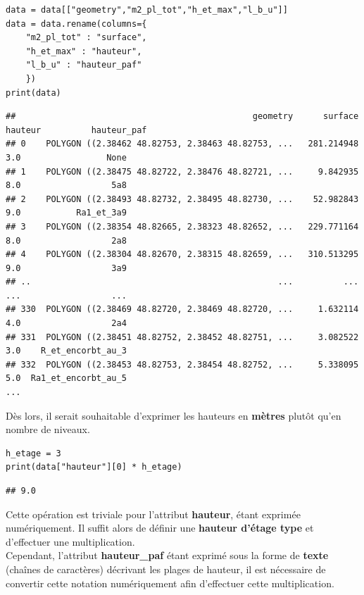 \documentclass[
  11pt,
  french,
]{article}
\begin{document}
\begin{tcolorbox}[title= Apurement et renommage du jeu de données ,colback=boitecode]
\begin{lstlisting}[style=code]
data = data[["geometry","m2_pl_tot","h_et_max","l_b_u"]]
data = data.rename(columns={
    "m2_pl_tot" : "surface",
    "h_et_max" : "hauteur",
    "l_b_u" : "hauteur_paf"
    })
print(data)\end{lstlisting}
\begin{lstlisting}[style=out]
##                                               geometry      surface  hauteur          hauteur_paf
## 0    POLYGON ((2.38462 48.82753, 2.38463 48.82753, ...   281.214948      3.0                 None
## 1    POLYGON ((2.38475 48.82722, 2.38476 48.82721, ...     9.842935      8.0                  5a8
## 2    POLYGON ((2.38493 48.82732, 2.38495 48.82730, ...    52.982843      9.0           Ra1_et_3a9
## 3    POLYGON ((2.38354 48.82665, 2.38323 48.82652, ...   229.771164      8.0                  2a8
## 4    POLYGON ((2.38304 48.82670, 2.38315 48.82659, ...   310.513295      9.0                  3a9
## ..                                                 ...          ...      ...                  ...
## 330  POLYGON ((2.38469 48.82720, 2.38469 48.82720, ...     1.632114      4.0                  2a4
## 331  POLYGON ((2.38451 48.82752, 2.38452 48.82751, ...     3.082522      3.0    R_et_encorbt_au_3
## 332  POLYGON ((2.38453 48.82753, 2.38454 48.82752, ...     5.338095      5.0  Ra1_et_encorbt_au_5
...
\end{lstlisting}
\end{tcolorbox}

Dès lors, il serait souhaitable d'exprimer les hauteurs en
\textbf{mètres} plutôt qu'en nombre de niveaux.

\begin{tcolorbox}[title= Transformation du nombre de niveaux en mètres ,colback=boitecode]
\begin{lstlisting}[style=code]
h_etage = 3
print(data["hauteur"][0] * h_etage)\end{lstlisting}
\begin{lstlisting}[style=out]
## 9.0
\end{lstlisting}
\end{tcolorbox}

Cette opération est triviale pour l'attribut \textbf{hauteur}, étant
exprimée numériquement. Il suffit alors de définir une \textbf{hauteur
d'étage type} et d'effectuer une multiplication.\\
Cependant, l'attribut \textbf{hauteur\_paf} étant exprimé sous la forme
de \textbf{texte} (chaînes de caractères) décrivant les plages de
hauteur, il est nécessaire de convertir cette notation numériquement
afin d'effectuer cette multiplication.
\end{document}
